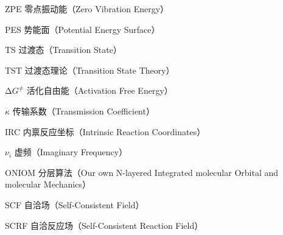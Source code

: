 \begin{denotation}[3cm]
  \item[ZPE] 零点振动能（Zero Vibration Energy）
  \item[PES] 势能面（Potential Energy Surface）
  \item[TS] 过渡态（Transition State）
  \item[TST] 过渡态理论（Transition State Theory）
  \item[$\increment G^\neq$] 活化自由能（Activation Free Energy）
  \item[$\kappa$] 传输系数（Transmission Coefficient）
  \item[IRC] 内禀反应坐标（Intrinsic Reaction Coordinates）
  \item[$\nu_i$] 虚频（Imaginary Frequency）
  \item[ONIOM] 分层算法（Our own N-layered Integrated molecular Orbital and molecular Mechanics）
  \item[SCF] 自洽场（Self-Consistent Field）
  \item[SCRF] 自洽反应场（Self-Consistent Reaction Field）
\end{denotation}





